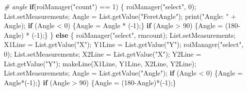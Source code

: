 \documentclass[10pt, b5paper, singlespacinge, twoside]{reedthesis} %
\newenvironment{Shaded}{}{}
\newcommand{\CommentTok}[1]{\textit{#1}}
\newcommand{\ControlFlowTok}[1]{\textbf{#1}}
\newcommand{\DecValTok}[1]{#1}
\newcommand{\FunctionTok}[1]{#1}
\newcommand{\NormalTok}[1]{#1}
\newcommand{\OtherTok}[1]{#1}
\newcommand{\SpecialCharTok}[1]{#1}
\newcommand{\StringTok}[1]{#1}
\theoremstyle{definition}
\theoremstyle{definition}
\theoremstyle{definition}
\theoremstyle{remark}
\begin{document}
\begin{Shaded}
\begin{Highlighting}[numbers=left,,]
    \CommentTok{\# angle}
        \ControlFlowTok{if}\NormalTok{(}\FunctionTok{roiManager}\NormalTok{(}\StringTok{"count"}\NormalTok{) }\SpecialCharTok{==} \DecValTok{1}\NormalTok{) \{}
            \FunctionTok{roiManager}\NormalTok{(}\StringTok{"select"}\NormalTok{, }\DecValTok{0}\NormalTok{);}
\NormalTok{            List.setMeasurements;}
\NormalTok{            Angle }\OtherTok{=} \FunctionTok{List.getValue}\NormalTok{(}\StringTok{"FeretAngle"}\NormalTok{);}
            \FunctionTok{print}\NormalTok{(}\StringTok{"Angle: "} \SpecialCharTok{+}\NormalTok{ Angle);}
            \ControlFlowTok{if}\NormalTok{ (Angle }\SpecialCharTok{\textless{}} \DecValTok{0}\NormalTok{) \{Angle }\OtherTok{=}\NormalTok{ Angle }\SpecialCharTok{*}\NormalTok{ (}\SpecialCharTok{{-}}\DecValTok{1}\NormalTok{);\}}
            \ControlFlowTok{if}\NormalTok{ (Angle }\SpecialCharTok{\textgreater{}} \DecValTok{90}\NormalTok{) \{Angle }\OtherTok{=}\NormalTok{ (}\DecValTok{180}\SpecialCharTok{{-}}\NormalTok{Angle) }\SpecialCharTok{*}\NormalTok{ (}\SpecialCharTok{{-}}\DecValTok{1}\NormalTok{);\}}
\NormalTok{        \} }\ControlFlowTok{else}\NormalTok{ \{}
            \FunctionTok{roiManager}\NormalTok{(}\StringTok{"select"}\NormalTok{, rmcount);}
\NormalTok{            List.setMeasurements;}
\NormalTok{            X1Line }\OtherTok{=} \FunctionTok{List.getValue}\NormalTok{(}\StringTok{"X"}\NormalTok{);}
\NormalTok{            Y1Line }\OtherTok{=} \FunctionTok{List.getValue}\NormalTok{(}\StringTok{"Y"}\NormalTok{);}
            \FunctionTok{roiManager}\NormalTok{(}\StringTok{"select"}\NormalTok{, }\DecValTok{0}\NormalTok{);}
\NormalTok{            List.setMeasurements;}
\NormalTok{            X2Line }\OtherTok{=} \FunctionTok{List.getValue}\NormalTok{(}\StringTok{"X"}\NormalTok{);}
\NormalTok{            Y2Line }\OtherTok{=} \FunctionTok{List.getValue}\NormalTok{(}\StringTok{"Y"}\NormalTok{);}
            \FunctionTok{makeLine}\NormalTok{(X1Line, Y1Line, X2Line, Y2Line);}
\NormalTok{            List.setMeasurements;}
\NormalTok{            Angle }\OtherTok{=} \FunctionTok{List.getValue}\NormalTok{(}\StringTok{"Angle"}\NormalTok{);}
            \ControlFlowTok{if}\NormalTok{ (Angle }\SpecialCharTok{\textless{}} \DecValTok{0}\NormalTok{) \{Angle }\OtherTok{=}\NormalTok{ Angle}\SpecialCharTok{*}\NormalTok{(}\SpecialCharTok{{-}}\DecValTok{1}\NormalTok{);\}}
            \ControlFlowTok{if}\NormalTok{ (Angle }\SpecialCharTok{\textgreater{}} \DecValTok{90}\NormalTok{) \{Angle }\OtherTok{=}\NormalTok{ (}\DecValTok{180}\SpecialCharTok{{-}}\NormalTok{Angle)}\SpecialCharTok{*}\NormalTok{(}\SpecialCharTok{{-}}\DecValTok{1}\NormalTok{);\}}

\end{Highlighting}
\end{Shaded}
\end{document}
